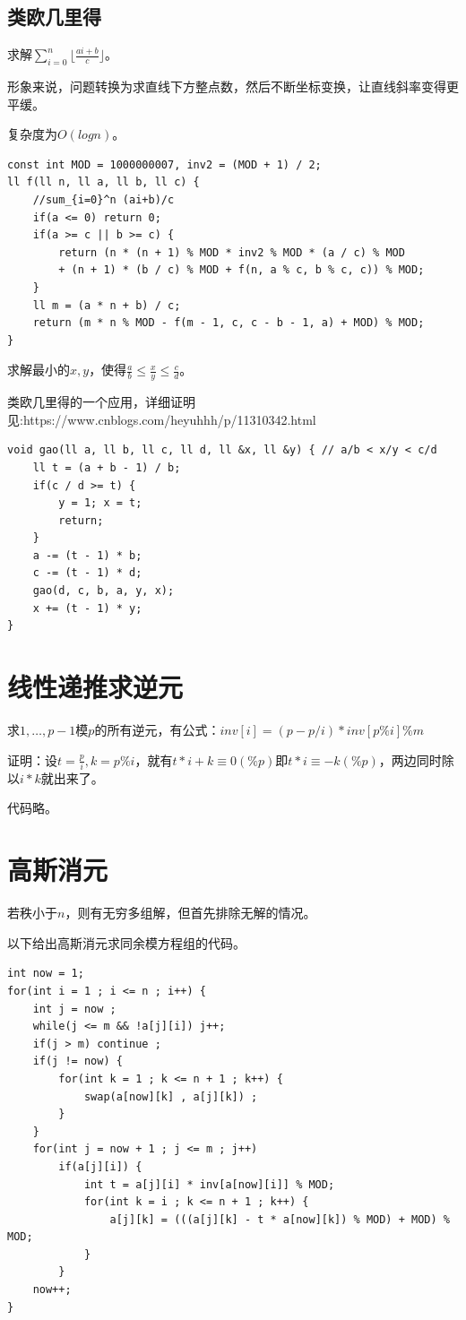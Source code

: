 \documentclass[a4paper,11pt,twoside,fontset = fandol,UTF8]{ctexbook} %
\begin{document}
	\subsection{类欧几里得}
	求解$\sum_{i=0}^n \lfloor\frac{ai+b}{c}\rfloor$。
	
	形象来说，问题转换为求直线下方整点数，然后不断坐标变换，让直线斜率变得更平缓。
	
	复杂度为$O(logn)$。
	\begin{lstlisting}
const int MOD = 1000000007, inv2 = (MOD + 1) / 2;
ll f(ll n, ll a, ll b, ll c) {
	//sum_{i=0}^n (ai+b)/c
    if(a <= 0) return 0;
    if(a >= c || b >= c) {
        return (n * (n + 1) % MOD * inv2 % MOD * (a / c) % MOD
        + (n + 1) * (b / c) % MOD + f(n, a % c, b % c, c)) % MOD;
    }
    ll m = (a * n + b) / c;
    return (m * n % MOD - f(m - 1, c, c - b - 1, a) + MOD) % MOD;
} 
	\end{lstlisting}
	
	求解最小的$x,y$，使得$\frac{a}{b}\leq \frac{x}{y}\leq \frac{c}{d}$。
	
	类欧几里得的一个应用，详细证明见:https://www.cnblogs.com/heyuhhh/p/11310342.html
	
	\begin{lstlisting}
void gao(ll a, ll b, ll c, ll d, ll &x, ll &y) { // a/b < x/y < c/d
    ll t = (a + b - 1) / b;
    if(c / d >= t) {
        y = 1; x = t;
        return;
    }
    a -= (t - 1) * b;
    c -= (t - 1) * d;
    gao(d, c, b, a, y, x);
    x += (t - 1) * y;
}
	\end{lstlisting}
	\section{线性递推求逆元}
	求$1,\dots,p-1$模$p$的所有逆元，有公式：$inv[i]=(p-p/i)*inv[p\%i]\%m$
	
	证明：设$t=\frac{p}{i},k=p\%i$，就有$t*i+k\equiv 0(\% p)$即$t*i\equiv -k(\% p)$，两边同时除以$i*k$就出来了。
	
	代码略。
	\section{高斯消元}
	若秩小于$n$，则有无穷多组解，但首先排除无解的情况。
	
	以下给出高斯消元求同余模方程组的代码。
	\begin{lstlisting}
int now = 1;
for(int i = 1 ; i <= n ; i++) {
    int j = now ;
    while(j <= m && !a[j][i]) j++;
    if(j > m) continue ;
    if(j != now) {	
        for(int k = 1 ; k <= n + 1 ; k++) {
            swap(a[now][k] , a[j][k]) ;
        }
    }
    for(int j = now + 1 ; j <= m ; j++)
        if(a[j][i]) {
            int t = a[j][i] * inv[a[now][i]] % MOD;
            for(int k = i ; k <= n + 1 ; k++) {
                a[j][k] = (((a[j][k] - t * a[now][k]) % MOD) + MOD) % MOD;
            }
        }
    now++;
} 
	\end{lstlisting}
\end{document}
